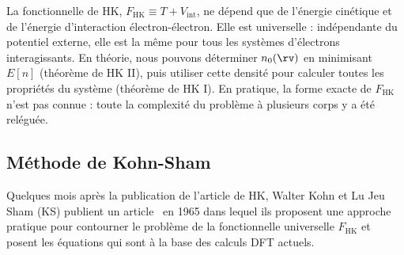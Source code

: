 La fonctionnelle de HK, $F_\text{HK}\equiv T+V_\text{int}$, ne dépend que de l'énergie cinétique et de l'énergie d'interaction électron-électron. Elle est universelle : indépendante du potentiel externe, elle est la même pour tous les systèmes d'électrons interagissants. En théorie, nous pouvons déterminer $n_0(\rv)$ en minimisant $E[n]$ (théorème de HK II), puis utiliser cette densité pour calculer toutes les propriétés du système (théorème de HK I). En pratique, la forme exacte de $F_\text{HK}$ n'est pas connue : toute la complexité du problème à plusieurs corps y a été reléguée. 

\subsection{Méthode de Kohn-Sham}\label{sec:KS}

Quelques mois après la publication de l'article de HK, Walter Kohn et Lu Jeu Sham (KS) publient un article~\cite{kohnSelfConsistentEquationsIncluding1965} en 1965 dans lequel ils proposent une approche pratique pour contourner le problème de la fonctionnelle universelle $F_\text{HK}$ et posent les équations qui sont à la base des calculs DFT actuels.


